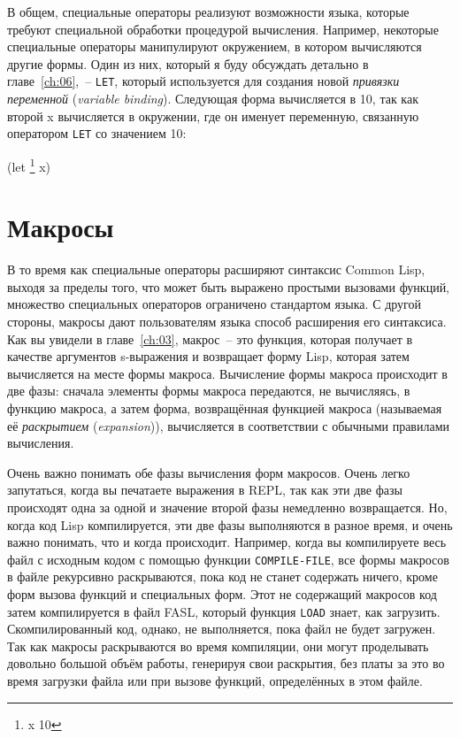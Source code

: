 В общем, специальные операторы реализуют возможности языка, которые требуют специальной
обработки процедурой вычисления. Например, некоторые специальные операторы манипулируют
окружением, в котором вычисляются другие формы. Один из них, который я буду обсуждать детально в
главе~\ref{ch:06},~-- \lstinline{LET}, который используется для создания новой \textit{привязки
  переменной} (\textit{variable binding}). Следующая форма вычисляется в 10, так как
второй x вычисляется в окружении, где он именует переменную, связанную оператором
\lstinline{LET} со значением 10:

\begin{myverb}
  (let \footnote{x 10} x)
\end{myverb}

\section{Макросы}

В то время как специальные операторы расширяют синтаксис Common Lisp, выходя за пределы
того, что может быть выражено простыми вызовами функций, множество специальных операторов
ограничено стандартом языка. С другой стороны, макросы дают пользователям языка способ
расширения его синтаксиса. Как вы увидели в главе~\ref{ch:03}, макрос~-- это функция, которая
получает в качестве аргументов s-выражения и возвращает форму Lisp, которая затем
вычисляется на месте формы макроса. Вычисление формы макроса происходит в две фазы:
сначала элементы формы макроса передаются, не вычисляясь, в функцию макроса, а затем
форма, возвращённая функцией макроса (называемая её \textit{раскрытием}
(\textit{expansion})), вычисляется в соответствии с обычными правилами вычисления.

Очень важно понимать обе фазы вычисления форм макросов. Очень легко запутаться, когда вы
печатаете выражения в REPL, так как эти две фазы происходят одна за одной и значение
второй фазы немедленно возвращается. Но, когда код Lisp компилируется, эти две фазы
выполняются в разное время, и очень важно понимать, что и когда происходит. Например,
когда вы компилируете весь файл с исходным кодом с помощью функции \lstinline{COMPILE-FILE},
все формы макросов в файле рекурсивно раскрываются, пока код не станет содержать ничего,
кроме форм вызова функций и специальных форм. Этот не содержащий макросов код затем
компилируется в файл FASL, который функция \lstinline{LOAD} знает, как
загрузить. Скомпилированный код, однако, не выполняется, пока файл не будет загружен. Так
как макросы раскрываются во время компиляции, они могут проделывать довольно
большой объём работы, генерируя свои раскрытия, без платы за это во время загрузки файла
или при вызове функций, определённых в этом файле.

